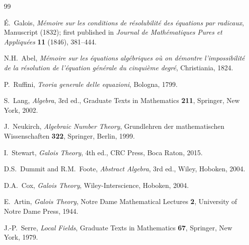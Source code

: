 \documentclass[12pt,a4paper]{amsart}
\theoremstyle{definition}
\begin{document}
\addtocounter{section}{-1}
\renewcommand{\thesection}{\Alph{section}}

\begin{thebibliography}{99}

\'{E}.~Galois,
\textit{M\'emoire sur les conditions de r\'esolubilit\'e des \'equations par
radicaux},
Manuscript (1832); first published in \textit{Journal de Math\'ematiques
Pures et Appliqu\'ees} \textbf{11} (1846), 381--444.

N.H.~Abel,
\textit{M\'emoire sur les \'equations alg\'ebriques o\`{u} on d\'emontre
l'impossibilit\'e de la r\'esolution de l'\'equation g\'en\'erale du cinqui\`eme
degr\'e},
Christiania, 1824.

P.~Ruffini,
\textit{Teoria generale delle equazioni},
Bologna, 1799.

S.~Lang,
\textit{Algebra}, 3rd ed.,
Graduate Texts in Mathematics \textbf{211},
Springer, New York, 2002.

J.~Neukirch,
\textit{Algebraic Number Theory},
Grundlehren der mathematischen Wissenschaften \textbf{322},
Springer, Berlin, 1999.

I.~Stewart,
\textit{Galois Theory}, 4th ed.,
CRC Press, Boca Raton, 2015.

D.S.~Dummit and R.M.~Foote,
\textit{Abstract Algebra}, 3rd ed.,
Wiley, Hoboken, 2004.

D.A.~Cox,
\textit{Galois Theory},
Wiley-Interscience, Hoboken, 2004.

E.~Artin,
\textit{Galois Theory},
Notre Dame Mathematical Lectures \textbf{2},
University of Notre Dame Press, 1944.

J.-P.~Serre,
\textit{Local Fields},
Graduate Texts in Mathematics \textbf{67},
Springer, New York, 1979.

\end{thebibliography}
\end{document}
